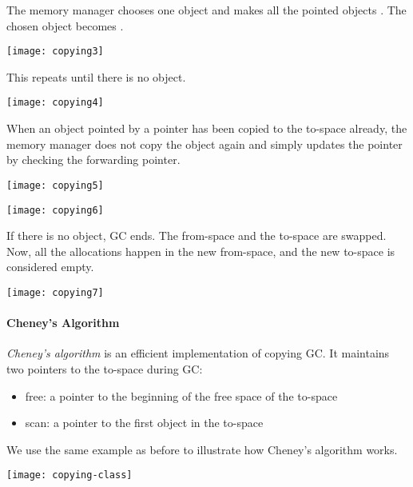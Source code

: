 The memory manager chooses one \uscn object and makes all the pointed \urch
objects \uscn. The chosen object becomes \scn.

\begin{center}
\texttt{[image: copying3]}
\end{center}

This repeats until there is no \uscn object.

\begin{center}
\texttt{[image: copying4]}
\end{center}

When an object pointed by a pointer has been copied to the to-space already, the
memory manager does not copy the object again and simply updates the pointer by
checking the forwarding pointer.

\begin{center}
\texttt{[image: copying5]}

\texttt{[image: copying6]}
\end{center}

If there is no \uscn object, GC ends. The from-space and the to-space are
swapped. Now, all the allocations happen in the new from-space, and the new
to-space is considered empty.

\begin{center}
\texttt{[image: copying7]}
\end{center}

\paragraph{Cheney's Algorithm}

\newcommand{\scan}{\textsf{scan}\xspace}
\newcommand{\free}{\textsf{free}\xspace}

\textit{Cheney's algorithm} is an efficient
implementation of copying GC. It maintains two pointers to the to-space during
GC:

\begin{itemize}
  \item \free: a pointer to the beginning of the free space of the to-space
  \item \scan: a pointer to the first \uscn object in the to-space
\end{itemize}

We use the same example as before to illustrate how Cheney's algorithm works.

\begin{center}
\texttt{[image: copying-class]}
\end{center}

